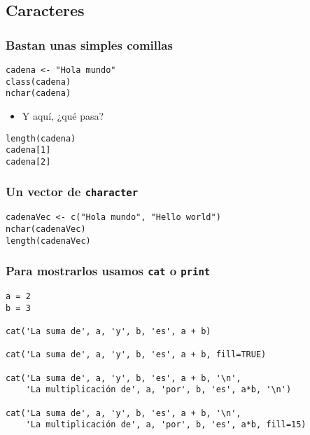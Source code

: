 \documentclass{beamer}
\begin{document}
\subsection{Caracteres}
\label{sec-4-2}
\begin{frame}[fragile]
\frametitle{Bastan unas simples comillas}
\label{sec-4-2-1}



\lstset{language=R}
\begin{lstlisting}
cadena <- "Hola mundo"
class(cadena)
nchar(cadena)
\end{lstlisting}

\begin{itemize}
\item Y aquí, ¿qué pasa?
\end{itemize}

\lstset{language=R}
\begin{lstlisting}
length(cadena)
cadena[1]
cadena[2]
\end{lstlisting}
\end{frame}
\begin{frame}[fragile]
\frametitle{Un vector de \texttt{character}}
\label{sec-4-2-2}


\lstset{language=R}
\begin{lstlisting}
cadenaVec <- c("Hola mundo", "Hello world")
nchar(cadenaVec)
length(cadenaVec)
\end{lstlisting}
\end{frame}
\begin{frame}[fragile]
\frametitle{Para mostrarlos usamos \texttt{cat} o \texttt{print}}
\label{sec-4-2-3}



\lstset{language=R}
\begin{lstlisting}
a = 2
b = 3

cat('La suma de', a, 'y', b, 'es', a + b)

cat('La suma de', a, 'y', b, 'es', a + b, fill=TRUE)

cat('La suma de', a, 'y', b, 'es', a + b, '\n',
    'La multiplicación de', a, 'por', b, 'es', a*b, '\n')

cat('La suma de', a, 'y', b, 'es', a + b, '\n',
    'La multiplicación de', a, 'por', b, 'es', a*b, fill=15)
\end{lstlisting}
\end{frame}
\end{document}
